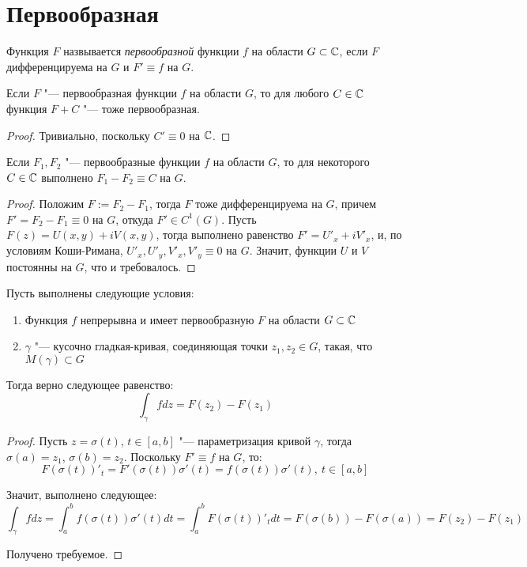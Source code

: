 \section{Первообразная}

\begin{definition}
	Функция $F$ назвывается \textit{первообразной} функции $f$ на области $G \subset \mathbb{C}$, если $F$ дифференцируема на $G$ и $F' \equiv f$ на $G$.
\end{definition}

\begin{note}
	Если $F$ "--- первообразная функции $f$ на области $G$, то для любого $C \in \mathbb{C}$ функция $F + C$ "--- тоже первообразная.
\end{note}

\begin{proof}
	Тривиально, поскольку $C' \equiv 0$ на $\mathbb{C}$.
\end{proof}

\begin{proposition}
	Если $F_1, F_2$ "--- первообразные функции $f$ на области $G$, то для некоторого $C \in \mathbb{C}$ выполнено $F_1 - F_2 \equiv C$ на $G$.
\end{proposition}

\begin{proof}
	Положим $F := F_2 - F_1$, тогда $F$ тоже дифференцируема на $G$, причем $F' = F_2 - F_1 \equiv 0$ на $G$, откуда $F' \in C^1(G)$. Пусть $F(z) = U(x, y) + iV(x, y)$, тогда выполнено равенство $F' = U'_x +iV'_x$, и, по условиям Коши-Римана, $U'_x, U'_y, V'_x, V'_y \equiv 0$ на $G$. Значит, функции $U$ и $V$ постоянны на $G$, что и требовалось.
\end{proof}

\begin{proposition}
	Пусть выполнены следующие условия:
	\begin{enumerate}
		\item Функция $f$ непрерывна и имеет первообразную $F$ на области $G \subset \mathbb{C}$
		\item $\gamma$ "--- кусочно гладкая-кривая, соединяющая точки $z_1, z_2 \in G$, такая, что $M(\gamma) \subset G$
	\end{enumerate}
	
	Тогда верно следующее равенство:
	\[\int_{\gamma}fdz = F(z_2) - F(z_1)\]
\end{proposition}

\begin{proof}
	Пусть $z = \sigma(t)$, $t \in [a, b]$ "--- параметризация кривой $\gamma$, тогда $\sigma(a) = z_1$, $\sigma(b) = z_2$. Поскольку $F' \equiv f$ на $G$, то:
	\[F(\sigma(t))'_t = F'(\sigma(t))\sigma'(t) = f(\sigma(t))\sigma'(t),~t \in [a, b]\]
	
	Значит, выполнено следующее:
	\[\int_\gamma fdz = \int_a^b f(\sigma(t))\sigma'(t)dt = \int_a^b F(\sigma(t))'_t dt = F(\sigma(b)) - F(\sigma(a)) = F(z_2) - F(z_1)\]
	
	Получено требуемое.
\end{proof}

